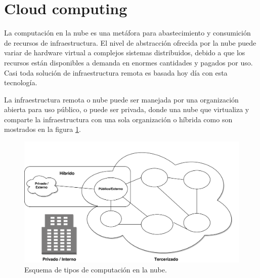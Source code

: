 \section{Cloud computing}
La computación en la nube es una metáfora para abastecimiento y consumición de recursos de infraestructura. El nivel de abstracción ofrecida por la nube puede variar de hardware virtual a complejos sistemas distribuidos, debido a que los recursos están disponibles a demanda en enormes cantidades y pagados por uso\citep{wittig_amazon_2016}. Casi toda solución de infraestructura remota es basada hoy día con esta tecnología.

La infraestructura remota o nube puede ser manejada por una organización abierta para uso público, o puede ser privada, donde una nube que virtualiza y comparte la infraestructura con una sola organización o híbrida como son mostrados en la figura \ref{cloud_types}.

\begin{figure}[H]
\centering
\includegraphics[width=125mm,scale=1]{Figuras/cloud_computing_types}
\caption{Esquema de tipos de computación en la nube.}
  \label{cloud_types}
\end{figure}
